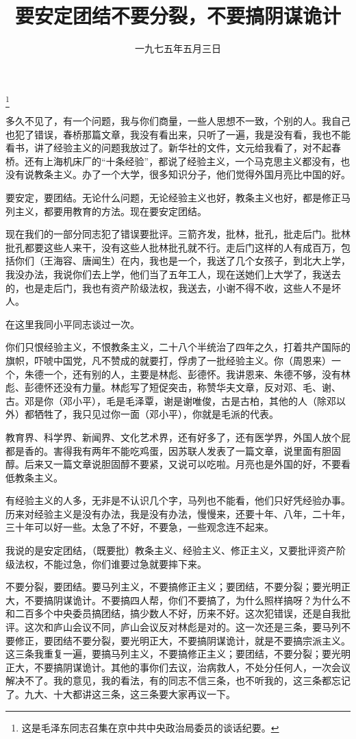 
\title{要安定团结不要分裂，不要搞阴谋诡计}
\date{一九七五年五月三日}
\thanks{这是毛泽东同志召集在京中共中央政治局委员的谈话纪要。}
\maketitle


多久不见了，有一个问题，我与你们商量，一些人思想不一致，个别的人。我自己也犯了错误，春桥那篇文章，我没有看出来，只听了一遍，我是没有看，我也不能看书，讲了经验主义的问题我放过了。新华社的文件，文元给我看了，对不起春桥。还有上海机床厂的“十条经验”，都说了经验主义，一个马克思主义都没有，也没有说教条主义。办了一个大学，很多知识分子，他们觉得外国月亮比中国的好。

要安定，要团结。无论什么问题，无论经验主义也好，教条主义也好，都是修正马列主义，都要用教育的方法。现在要安定团结。

现在我们的一部分同志犯了错误要批评。三箭齐发，批林，批孔，批走后门。批林批孔都要这些人来干，没有这些人批林批孔就不行。走后门这样的人有成百万，包括你们（王海容、唐闻生）在内，我也是一个，我送了几个女孩子，到北大上学，我没办法，我说你们去上学，他们当了五年工人，现在送她们上大学了，我送去的，也是走后门，我也有资产阶级法权，我送去，小谢不得不收，这些人不是坏人。

在这里我同小平同志谈过一次。

你们只恨经验主义，不恨教条主义，二十八个半统治了四年之久，打着共产国际的旗帜，吓唬中国党，凡不赞成的就要打，俘虏了一批经验主义。你（周恩来）一个，朱德一个，还有别的人，主要是林彪、彭德怀。我讲恩来、朱德不够，没有林彪、彭德怀还没有力量。林彪写了短促突击，称赞华夫文章，反对邓、毛、谢、古。邓是你（邓小平），毛是毛泽覃，谢是谢唯俊，古是古柏，其他的人（除邓以外）都牺牲了，我只见过你一面（邓小平），你就是毛派的代表。

教育界、科学界、新闻界、文化艺术界，还有好多了，还有医学界，外国人放个屁都是香的。害得我有两年不能吃鸡蛋，因苏联人发表了一篇文章，说里面有胆固醇。后来又一篇文章说胆固醇不要紧，又说可以吃啦。月亮也是外国的好，不要看低教条主义。

有经验主义的人多，无非是不认识几个字，马列也不能看，他们只好凭经验办事。历来对经验主义是没有办法，我是没有办法，慢慢来，还要十年、八年，二十年，三十年可以好一些。太急了不好，不要急，一些观念连不起来。

我说的是安定团结，（既要批）教条主义、经验主义、修正主义，又要批评资产阶级法权，不能过急，你们谁要过急就要摔下来。

不要分裂，要团结。要马列主义，不要搞修正主义；要团结，不要分裂；要光明正大，不要搞阴谋诡计。不要搞四人帮，你们不要搞了，为什么照样搞呀？为什么不和二百多个中央委员搞团结，搞少数人不好，历来不好。这次犯错误，还是自我批评。这次和庐山会议不同，庐山会议反对林彪是对的。这一次还是三条，要马列不要修正，要团结不要分裂，要光明正大，不要搞阴谋诡计，就是不要搞宗派主义。这三条我重复一遍，要搞马列主义，不要搞修正主义；要团结，不要分裂；要光明正大，不要搞阴谋诡计。其他的事你们去议，治病救人，不处分任何人，一次会议解决不了。我的意见，我的看法，有的同志不信三条，也不听我的，这三条都忘记了。九大、十大都讲这三条，这三条要大家再议一下。

